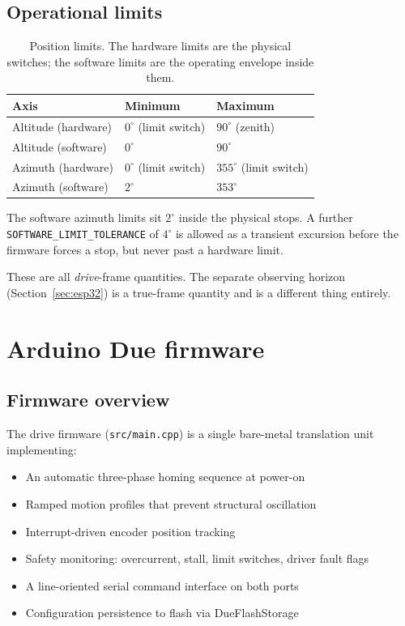 \documentclass[11pt,a4paper]{article}
\begin{document}
\subsection{Operational limits}

\begin{table}[H]
\centering
\caption{Position limits. The hardware limits are the physical switches; the software limits are the operating envelope inside them.}
\label{tab:limits}
\begin{tabular}{lll}
\toprule
\textbf{Axis} & \textbf{Minimum} & \textbf{Maximum} \\
\midrule
Altitude (hardware) & $0^\circ$ (limit switch) & $90^\circ$ (zenith) \\
Altitude (software) & $0^\circ$ & $90^\circ$ \\
Azimuth (hardware) & $0^\circ$ (limit switch) & $355^\circ$ (limit switch) \\
Azimuth (software) & $2^\circ$ & $353^\circ$ \\
\bottomrule
\end{tabular}
\end{table}

The software azimuth limits sit $2^\circ$ inside the physical stops. A further \texttt{SOFTWARE\_LIMIT\_TOLERANCE} of $4^\circ$ is allowed as a transient excursion before the firmware forces a stop, but never past a hardware limit.

These are all \emph{drive}-frame quantities. The separate observing horizon (Section~\ref{sec:esp32}) is a true-frame quantity and is a different thing entirely.

\section{Arduino Due firmware}
\label{sec:due-firmware}

\subsection{Firmware overview}

The drive firmware (\texttt{src/main.cpp}) is a single bare-metal translation unit implementing:

\begin{itemize}
    \item An automatic three-phase homing sequence at power-on
    \item Ramped motion profiles that prevent structural oscillation
    \item Interrupt-driven encoder position tracking
    \item Safety monitoring: overcurrent, stall, limit switches, driver fault flags
    \item A line-oriented serial command interface on both ports
    \item Configuration persistence to flash via DueFlashStorage
\end{itemize}
\end{document}
